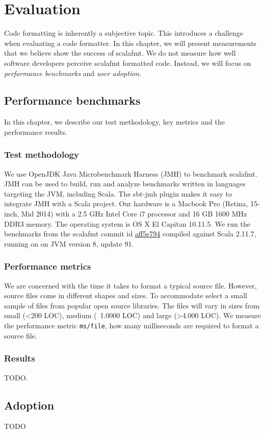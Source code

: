 \section{Evaluation}
Code formatting is inherently a subjective topic.
This introduces a challenge when evaluating a code formatter.
In this chapter, we will present measurements that we believe show the success of scalafmt.
We do not measure how well software developers perceive scalafmt formatted code.
Instead, we will focus on \emph{performance benchmarks} and \emph{user adoption}.

\subsection{Performance benchmarks}
In this chapter, we describe our test methodology, key metrics and the performance results.

\subsubsection{Test methodology}
We use OpenJDK Java Microbenchmark Harness (JMH)\autocite{OpenJ38:online} to benchmark scalafmt.
JMH can be used to build, run and analyze benchmarks written in languages targeting the JVM, including Scala.
The sbt-jmh\autocite{ktoso84:online} plugin makes it easy to integrate JMH with a Scala project.
Our hardware is a Macbook Pro (Retina, 15-inch, Mid 2014) with a 2.5 GHz Intel Core i7 processor and 16 GB 1600 MHz DDR3 memory.
The operating system is OS X El Capitan 10.11.5.
We run the benchmarks from the scalafmt commit id \href{https://github.com/olafurpg/scalafmt/tree/aff5e794dae4787b08243f8abb87a3ca4d907e40}{aff5e794} compiled against Scala 2.11.7, running on
on JVM version 8, update 91.

\subsubsection{Performance metrics}
We are concerned with the time it takes to format a typical source file.
However, source files come in different shapes and sizes.
To accommodate select a small sample of files from popular open source libraries.
The files will vary in sizes from small (<200 LOC), medium (~1.0000 LOC) and large (>4.000 LOC).
We measure the performance metric \texttt{ms/file}, how many milliseconds are required to format a source file.

\subsubsection{Results}
TODO.

\subsection{Adoption}\label{sec:adoption}
TODO


